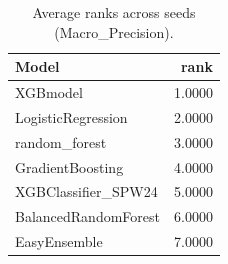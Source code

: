 \begin{table}[t]
\centering
\begin{tabular}{lr}
\toprule
Model & rank \\
\midrule
XGBmodel & 1.0000 \\
LogisticRegression & 2.0000 \\
random_forest & 3.0000 \\
GradientBoosting & 4.0000 \\
XGBClassifier_SPW24 & 5.0000 \\
BalancedRandomForest & 6.0000 \\
EasyEnsemble & 7.0000 \\
\bottomrule
\end{tabular}
\caption{Average ranks across seeds (Macro_Precision).}
\label{tab:avg_rank_Macro_Precision}
\end{table}